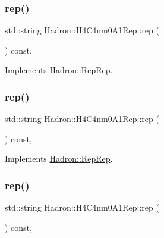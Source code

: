 \subsubsection{\texorpdfstring{rep()}{rep()}\hspace{0.1cm}{\footnotesize\ttfamily [1/3]}}
{\footnotesize\ttfamily std\+::string Hadron\+::\+H4\+C4nm0\+A1\+Rep\+::rep (\begin{DoxyParamCaption}{ }\end{DoxyParamCaption}) const\hspace{0.3cm}{\ttfamily [inline]}, {\ttfamily [virtual]}}



Implements \mbox{\hyperlink{structHadron_1_1RepRep_ab3213025f6de249f7095892109575fde}{Hadron\+::\+Rep\+Rep}}.

\mbox{\label{structHadron_1_1H4C4nm0A1Rep_a3f4b3af1601f3bc5c2a954c3e8c13c18}} 
\subsubsection{\texorpdfstring{rep()}{rep()}\hspace{0.1cm}{\footnotesize\ttfamily [2/3]}}
{\footnotesize\ttfamily std\+::string Hadron\+::\+H4\+C4nm0\+A1\+Rep\+::rep (\begin{DoxyParamCaption}{ }\end{DoxyParamCaption}) const\hspace{0.3cm}{\ttfamily [inline]}, {\ttfamily [virtual]}}



Implements \mbox{\hyperlink{structHadron_1_1RepRep_ab3213025f6de249f7095892109575fde}{Hadron\+::\+Rep\+Rep}}.

\mbox{\label{structHadron_1_1H4C4nm0A1Rep_a3f4b3af1601f3bc5c2a954c3e8c13c18}} 
\subsubsection{\texorpdfstring{rep()}{rep()}\hspace{0.1cm}{\footnotesize\ttfamily [3/3]}}
{\footnotesize\ttfamily std\+::string Hadron\+::\+H4\+C4nm0\+A1\+Rep\+::rep (\begin{DoxyParamCaption}{ }\end{DoxyParamCaption}) const\hspace{0.3cm}{\ttfamily [inline]}, {\ttfamily [virtual]}}



